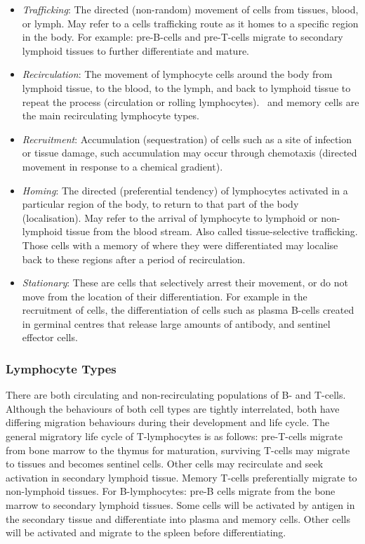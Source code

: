 \begin{itemize}
	\item \emph{Trafficking}: The directed (non-random) movement of cells from tissues, blood, or lymph. May refer to a cells trafficking route as it homes to a specific region in the body. For example: pre-B-cells and pre-T-cells migrate to secondary lymphoid tissues to further differentiate and mature.
	\item \emph{Recirculation}: The movement of lymphocyte cells around the body from lymphoid tissue, to the blood, to the lymph, and back to lymphoid tissue to repeat the process (circulation or rolling lymphocytes). \Naive\ and memory cells are the main recirculating lymphocyte types. 
	\item \emph{Recruitment}: Accumulation (sequestration) of cells such as a site of infection or tissue damage, such accumulation may occur through chemotaxis (directed movement in response to a chemical gradient). 
	\item \emph{Homing}: The directed (preferential tendency) of lymphocytes activated in a particular region of the body, to return to that part of the body (localisation). May refer to the arrival of lymphocyte to lymphoid or non-lymphoid tissue from the blood stream. Also called tissue-selective trafficking. Those cells with a memory of where they were differentiated may localise back to these regions after a period of recirculation.
	\item \emph{Stationary}: These are cells that selectively arrest their movement, or do not move from the location of their differentiation. For example in the recruitment of cells, the differentiation of cells such as plasma B-cells created in germinal centres that release large amounts of antibody, and sentinel effector cells.
\end{itemize}

%
%
\subsubsection{Lymphocyte Types}
\label{subsubsec:tissues:migration:mobility:cells}
There are both circulating and non-recirculating populations of B- and T-cells. Although the behaviours of both cell types are tightly interrelated, both have differing migration behaviours during their development and life cycle. The general migratory life cycle of T-lymphocytes is as follows: pre-T-cells migrate from bone marrow to the thymus for maturation, surviving T-cells may migrate to tissues and becomes sentinel cells. Other cells may recirculate and seek activation in secondary lymphoid tissue. Memory T-cells preferentially migrate to non-lymphoid tissues. For B-lymphocytes: pre-B cells migrate from the bone marrow to secondary lymphoid tissues. Some cells will be activated by antigen in the secondary tissue and differentiate into plasma and memory cells. Other cells will be activated and migrate to the spleen before differentiating. 


